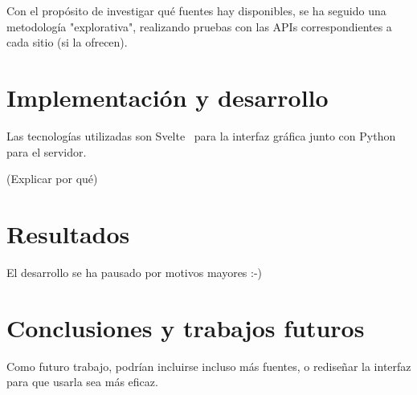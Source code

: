 Con el propósito de investigar qué fuentes hay disponibles, se ha seguido una metodología "explorativa", realizando pruebas con las APIs correspondientes a cada sitio (si la ofrecen).

\chapter{Implementación y desarrollo}

Las tecnologías utilizadas son Svelte~\cite{svelte} para la interfaz gráfica junto con Python~\cite{python} para el servidor.

(Explicar por qué)

\chapter{Resultados}

El desarrollo se ha pausado por motivos mayores :-)

\chapter{Conclusiones y trabajos futuros}

Como futuro trabajo, podrían incluirse incluso más fuentes, o rediseñar la interfaz para que usarla sea más eficaz.
